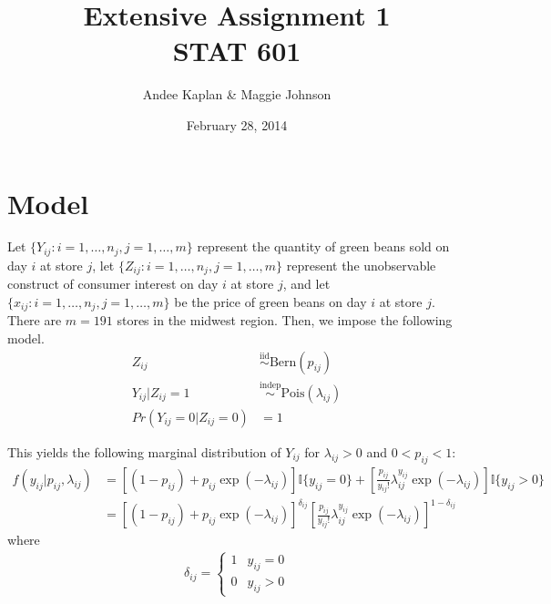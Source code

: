 \documentclass{article}\usepackage[]{graphicx}\usepackage[]{color}
\title{Extensive Assignment 1 \\ {STAT 601}}
\author{Andee Kaplan \& Maggie Johnson}
\date{February 28, 2014}
\theoremstyle{plain}
\begin{document}
\maketitle



\section*{Model}
Let $\{Y_{ij}: i=1,\dots,n_j, j=1,\dots,m\}$ represent the quantity of green beans sold on day $i$ at store $j$, let $\{Z_{ij}: i=1,\dots,n_j, j=1,\dots,m\}$ represent the unobservable construct of consumer interest on day $i$ at store $j$, and let $\{x_{ij}: i=1,\dots,n_j, j=1,\dots,m\}$ be the price of green beans on day $i$ at store $j$. There are $m=191$ stores in the midwest region. Then, we impose the following model.
\begin{align*}
Z_{ij} &\stackrel{\text{iid}}{\sim} \text{Bern}(p_{ij}) \\
Y_{ij} | Z_{ij} = 1 &\stackrel{\text{indep}}{\sim} \text{Pois}(\lambda_{ij}) \\
Pr(Y_{ij} =0| Z_{ij} = 0) &= 1
\end{align*}

This yields the following marginal distribution of $Y_{ij}$ for $\lambda_{ij} > 0$ and $0 < p_{ij} < 1$:
\begin{align*}
f(y_{ij}|p_{ij}, \lambda_{ij}) &= \left[(1-p_{ij}) + p_{ij} \exp(-\lambda_{ij})\right] \mathbb{I}\{y_{ij} = 0\} + \left[ \frac{p_{ij}}{y_{ij} !} \lambda_{ij}^{y_{ij}}\exp(-\lambda_{ij}) \right]\mathbb{I}\{y_{ij} > 0\} \\
&= \left[(1-p_{ij}) + p_{ij} \exp(-\lambda_{ij})\right]^{\delta_{ij}} \left[ \frac{p_{ij}}{y_{ij} !} \lambda_{ij}^{y_{ij}}\exp(-\lambda_{ij}) \right] ^{1-\delta_{ij}}
\end{align*}
where 
\begin{align*}
\delta_{ij} = \begin{cases}
1 & y_{ij} = 0 \\
0 & y_{ij} > 0
\end{cases}
\end{align*}
\end{document}
